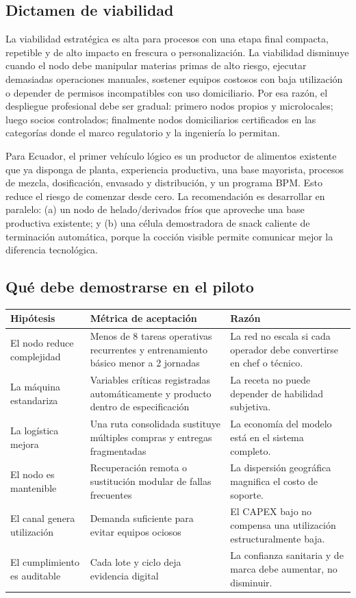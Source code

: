 \documentclass[11pt,a4paper]{article}
\begin{document}
\subsection{Dictamen de viabilidad}
La viabilidad estratégica es alta para procesos con una etapa final compacta, repetible y de alto impacto
en frescura o personalización. La viabilidad disminuye cuando el nodo debe manipular materias primas de
alto riesgo, ejecutar demasiadas operaciones manuales, sostener equipos costosos con baja utilización o
depender de permisos incompatibles con uso domiciliario. Por esa razón, el despliegue profesional debe ser
gradual: primero nodos propios y microlocales; luego socios controlados; finalmente nodos domiciliarios
certificados en las categorías donde el marco regulatorio y la ingeniería lo permitan.

Para Ecuador, el primer vehículo lógico es un productor de alimentos existente que ya disponga de planta,
experiencia productiva, una base mayorista, procesos de mezcla, dosificación, envasado y distribución, y
un programa BPM. Esto reduce el riesgo de comenzar desde cero. La recomendación es desarrollar en
paralelo: (a) un nodo de helado/derivados fríos que aproveche una base productiva existente; y (b) una
célula demostradora de snack caliente de terminación automática, porque la cocción visible permite
comunicar mejor la diferencia tecnológica.

\subsection{Qué debe demostrarse en el piloto}
{\small
\begin{xltabular}{\textwidth}{@{}P{3.4cm}LL@{}}
\toprule
\textbf{Hipótesis} & \textbf{Métrica de aceptación} & \textbf{Razón}\\ \midrule
El nodo reduce complejidad & Menos de 8 tareas operativas recurrentes y entrenamiento básico menor a 2 jornadas & La red no escala si cada operador debe convertirse en chef o técnico.\\
La máquina estandariza & Variables críticas registradas automáticamente y producto dentro de especificación & La receta no puede depender de habilidad subjetiva.\\
La logística mejora & Una ruta consolidada sustituye múltiples compras y entregas fragmentadas & La economía del modelo está en el sistema completo.\\
El nodo es mantenible & Recuperación remota o sustitución modular de fallas frecuentes & La dispersión geográfica magnifica el costo de soporte.\\
El canal genera utilización & Demanda suficiente para evitar equipos ociosos & El CAPEX bajo no compensa una utilización estructuralmente baja.\\
El cumplimiento es auditable & Cada lote y ciclo deja evidencia digital & La confianza sanitaria y de marca debe aumentar, no disminuir.\\
\bottomrule
\end{xltabular}}
\end{document}

